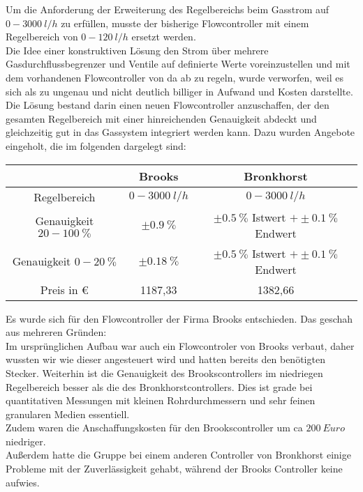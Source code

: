 Um die Anforderung der Erweiterung des Regelbereichs beim Gasstrom auf $\SI{0} - \SI{3000}{l/h}$ zu erfüllen, musste der bisherige Flowcontroller mit einem Regelbereich von $\SI{0} - \SI{120}{l/h}$ ersetzt werden. \\
Die Idee einer konstruktiven Lösung den Strom über mehrere Gasdurchflussbegrenzer und Ventile auf definierte Werte voreinzustellen und mit dem vorhandenen Flowcontroller von da ab zu regeln, wurde verworfen, weil es sich als zu ungenau und nicht deutlich billiger in Aufwand und Kosten darstellte. \\
Die Lösung bestand darin einen neuen Flowcontroller anzuschaffen, der den gesamten Regelbereich mit einer hinreichenden Genauigkeit abdeckt und gleichzeitig gut in das Gassystem integriert werden kann. Dazu wurden Angebote eingeholt, die im folgenden dargelegt sind:

\begin{tabular}{|c|c|c|}
	\hline  & Brooks & Bronkhorst \\ 
	\hline Regelbereich & $\SI{0} - \SI{3000}{l/h}$ & $\SI{0} - \SI{3000}{l/h}$ \\ 
	\hline Genauigkeit $20 - \SI{100}{\%}$ & $\pm \SI{0,9}{\%}$ & $\pm \SI{0,5}{\%}$ Istwert $+ \pm \SI{0,1}{\%}$ Endwert\\ 
	\hline Genauigkeit $0 - \SI{20}{\%}$ & $\pm \SI{0,18}{\%}$ & $\pm \SI{0,5}{\%}$ Istwert $+ \pm \SI{0,1}{\%}$ Endwert \\ 
	\hline Preis in \euro & 1187,33 & 1382,66 \\ 
	\hline 
\end{tabular} 

\vspace{0,5cm}

Es wurde sich für den Flowcontroller der Firma Brooks entschieden. Das geschah aus mehreren Gründen: \\
Im ursprünglichen Aufbau war auch ein Flowcontroler von Brooks verbaut, daher wussten wir wie dieser angesteuert wird und hatten bereits den benötigten Stecker. Weiterhin ist die Genauigkeit des Brookscontrollers im niedriegen Regelbereich besser als die des Bronkhorstcontrollers. Dies ist grade bei quantitativen Messungen mit kleinen Rohrdurchmessern und sehr feinen granularen Medien essentiell. \\
Zudem waren die Anschaffungskosten für den Brookscontroller um ca $\SI{200}{Euro}$ niedriger.\\
Außerdem hatte die Gruppe bei einem anderen Controller von Bronkhorst einige Probleme mit der Zuverlässigkeit gehabt, während der Brooks Controller keine aufwies.















